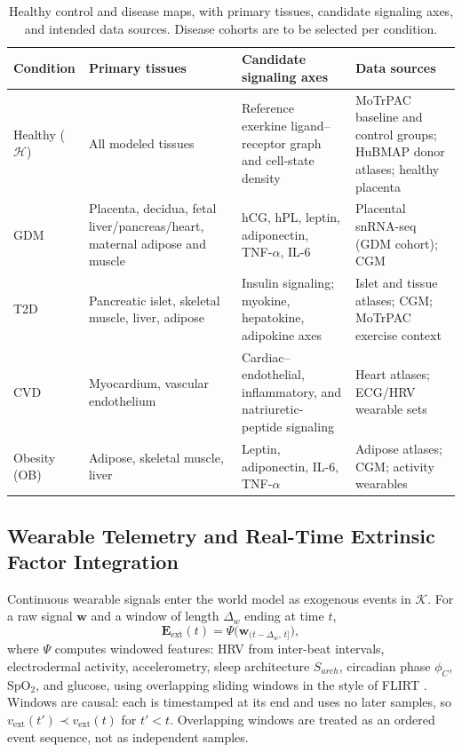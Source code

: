 \documentclass[11pt]{article}
\begin{document}
\begin{table}[htpb]
\caption{Healthy control and disease maps, with primary tissues, candidate signaling axes, and intended data sources. Disease cohorts are to be selected per condition.}
\centering
\renewcommand{\arraystretch}{1.4}
\small
\begin{tabularx}{\textwidth}{@{} >{\raggedright\arraybackslash}p{2.2cm} >{\raggedright\arraybackslash}p{3.7cm} >{\raggedright\arraybackslash}X >{\raggedright\arraybackslash}p{3.9cm} @{}}
\toprule
\textbf{Condition} & \textbf{Primary tissues} & \textbf{Candidate signaling axes} & \textbf{Data sources} \\
\midrule
Healthy ($\mathcal{H}$) & All modeled tissues & Reference exerkine ligand--receptor graph and cell-state density & MoTrPAC baseline and control groups; HuBMAP donor atlases; healthy placenta \\
GDM & Placenta, decidua, fetal liver/pancreas/heart, maternal adipose and muscle & hCG, hPL, leptin, adiponectin, TNF-$\alpha$, IL-6 & Placental snRNA-seq (GDM cohort); CGM \\
T2D & Pancreatic islet, skeletal muscle, liver, adipose & Insulin signaling; myokine, hepatokine, adipokine axes & Islet and tissue atlases; CGM; MoTrPAC exercise context \\
CVD & Myocardium, vascular endothelium & Cardiac--endothelial, inflammatory, and natriuretic-peptide signaling & Heart atlases; ECG/HRV wearable sets \\
Obesity (OB) & Adipose, skeletal muscle, liver & Leptin, adiponectin, IL-6, TNF-$\alpha$ & Adipose atlases; CGM; activity wearables \\
\bottomrule
\end{tabularx}
\label{tab:diseasemaps}
\end{table}

\subsection{Wearable Telemetry and Real-Time Extrinsic Factor Integration}
\label{sec:wearable}
Continuous wearable signals enter the world model as exogenous events in $\mathcal{K}$. For a raw signal $\mathbf{w}$ and a window of length $\Delta_w$ ending at time $t$,
\begin{equation}
\mathbf{E}_{\text{ext}}(t)=\Psi\big(\mathbf{w}_{(t-\Delta_w,\,t]}\big),
\end{equation}
where $\Psi$ computes windowed features: HRV from inter-beat intervals, electrodermal activity, accelerometry, sleep architecture $S_{arch}$, circadian phase $\phi_C$, SpO$_2$, and glucose, using overlapping sliding windows in the style of FLIRT \cite{dbdp}. Windows are causal: each is timestamped at its end and uses no later samples, so $v_{\text{ext}}(t')\prec v_{\text{ext}}(t)$ for $t'<t$. Overlapping windows are treated as an ordered event sequence, not as independent samples.
\end{document}

